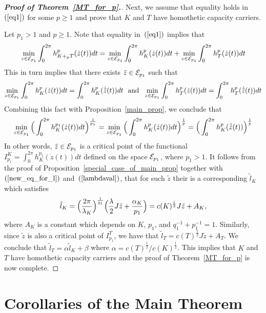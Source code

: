 \documentclass[12pt]{article}
\begin{document}
\begin{proof}[{\bf Proof of Theorem~\ref{MT_for_p}.}]
Next, we assume that equality holds in~$(\ref{eq1})$ for some $p
\geq 1$ and prove that $K$ and $T$ have homothetic capacity
carriers.

Let $p_1 > 1$ and $p \geq 1$. Note that equality in~$(\ref{eq1})$
implies that
$$ \min_{z \in {\cal E}_{p_1}} \int_0^{2\pi} h_{K+_pT}^p(\dot
z(t))dt = \min_{z \in {\cal E}_{p_1}} \int_0^{2\pi} h_{K}^p(\dot
z(t))dt + \min_{z \in {\cal E}_{p_1}} \int_0^{2\pi} h_{T}^p(\dot
z(t))dt$$ This in turn implies that there exists ${\tilde z} \in
{\cal E}_{p_1} $ such that
$$ \min_{z \in {\cal E}_{p_1}} \int_0^{2\pi} h_{K}^p(\dot z(t))dt = \int_0^{2\pi} h_{K}^p(\dot {\tilde z}(t))dt \ \ {\rm and} \ \
\min_{z \in {\cal E}_{p_1}} \int_0^{2\pi} h_{T}^p(\dot z(t))dt =
\int_0^{2\pi} h_{T}^p(\dot {\tilde z}(t))dt$$
 Combining this fact with Proposition~\ref{main_prop},
 we conclude that
$$
\min_{z \in {\cal E}_{p_1}} \Big ( \int_0^{2\pi} h_{K}^{p_1}(\dot
z(t))dt \Big )^{\frac 1 {p_1}}  = \min_{z \in {\cal E}_{p_1}} \Big (
\int_0^{2\pi} h_{K}^p(\dot z(t))dt \Big )^{\frac 1 p}  = \Big (
\int_0^{2\pi} h_{K}^p(\dot {\tilde z}(t)) \Big )^{\frac 1 p}
 $$
In other words, ${\tilde z} \in {\cal E}_{p_1}$ is a critical point
of the functional $I^K_{p_1}=\int_0^{2\pi} h_{K}^{p_1}(\dot z(t))dt
$
 defined on the space ${\cal E}_{p_1}$, where $p_1 > 1$. It follows from the proof of
 Proposition~\ref{special_case_of_main_prop} together with~$(\ref{new_eq_for_l})$ and~$(\ref{lambdaval})$, that
for such ${\tilde z}$ their is a
 corresponding ${\tilde l}_K$
which satisfies
$$ {\tilde l}_K = \Bigl ({\frac {2 \pi} {\lambda_K}}\Bigr)^{\frac 1 {q_1}} \Bigl ( {\frac \lambda 2} J {\tilde z} + {\frac {\alpha_K} {p_1}} \Bigr) = c(K)^{\frac 1 2}J {\tilde z} + A_K,$$
where $A_K$ is a constant which depends on $K$, $p_1$,
and $q_1^{-1} + p_1^{-1} = 1$. Similarly, since ${\tilde z}$ is also
a critical point of $I^T_{p_1}$, we have that ${\tilde l}_T =
c(T)^{\frac 1 2}J {\tilde z} + A_T$. We conclude that ${\tilde l}_T
= \alpha {\tilde l}_K + \beta$ where $\alpha = c(T)^{\frac 1
2}/c(K)^{\frac 1 2}$. This implies that
 $K$ and $T$ have homothetic capacity carriers and the
 proof of Theorem~\ref{MT_for_p} is now complete.
\end{proof}

\section{Corollaries of the Main Theorem}\label{Section-Corr&Disscussion}
\end{document}
